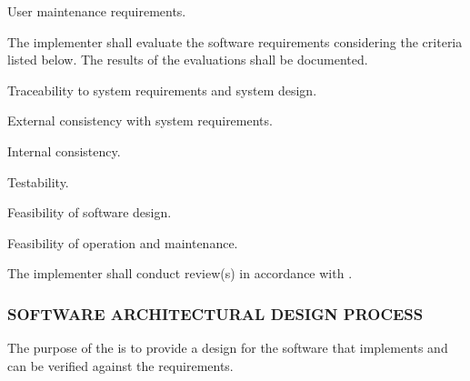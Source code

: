 \begin{adjustwidth}{2em}{0pt}
\begin{compactenum}
\begin{compactenum}
\begin{compactenum}
							\item User maintenance requirements.

						\end{compactenum}

						\item The implementer shall evaluate the software requirements considering the criteria listed below. The results of the evaluations shall be documented.

						\begin{compactenum}

							\item Traceability to system requirements and system design.

							\item External consistency with system requirements.

							\item Internal consistency.

							\item Testability.

							\item Feasibility of software design.

							\item Feasibility of operation and maintenance.

						\end{compactenum}

						\item The implementer shall conduct review(s) in accordance with .

					\end{compactenum}

				\end{compactenum}

			\end{adjustwidth}

		\newpage
		\subsubsection{SOFTWARE ARCHITECTURAL DESIGN PROCESS\label{proc:software_architectural_design_process}}

			\begin{adjustwidth}{2em}{0pt} 
				
				The purpose of the  is to provide a design for the software that implements and can be verified against the requirements.

			\end{adjustwidth}


